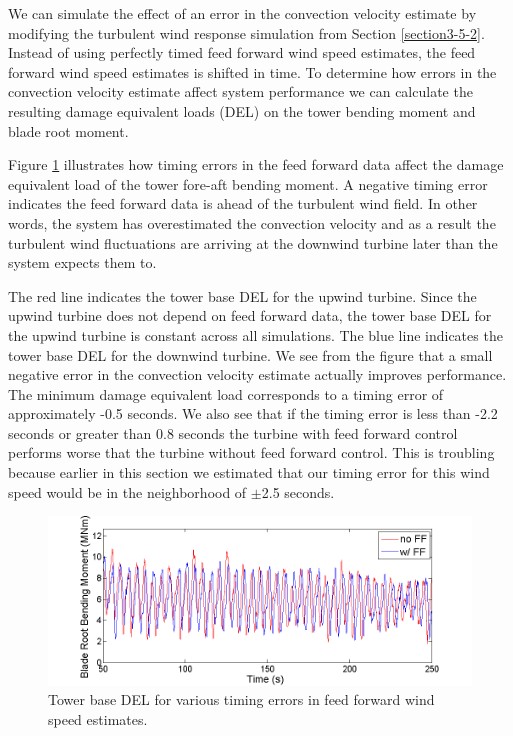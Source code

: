 We can simulate the effect of an error in the convection velocity estimate by modifying the turbulent wind response simulation from Section \ref{section3-5-2}. Instead of using perfectly timed feed forward wind speed estimates, the feed forward wind speed estimates is shifted in time. To determine how errors in the convection velocity estimate affect system performance we can calculate the resulting damage equivalent loads (DEL) on the tower bending moment and blade root moment.

Figure \ref{fig3-36} illustrates how timing errors in the feed forward data affect the damage equivalent load of the tower fore-aft bending moment. A negative timing error indicates the feed forward data is ahead of the turbulent wind field. In other words, the system has overestimated the convection velocity and as a result the turbulent wind fluctuations are arriving at the downwind turbine later than the system expects them to. 

The red line indicates the tower base DEL for the upwind turbine. Since the upwind turbine does not depend on feed forward data, the tower base DEL for the upwind turbine is constant across all simulations. The blue line indicates the tower base DEL for the downwind turbine. We see from the figure that a small negative error in the convection velocity estimate actually improves performance. The minimum damage equivalent load corresponds to a timing error of approximately -0.5 seconds. We also see that if the timing error is less than -2.2 seconds or greater than 0.8 seconds the turbine with feed forward control performs worse that the turbine without feed forward control. This is troubling because earlier in this section we estimated that our timing error for this wind speed would be in the neighborhood of $\pm$2.5 seconds.

\begin{figure}[htbp]
	\centering
		\includegraphics[width = \linewidth]{Figures/ch3Figures/fig3-35.png}
		
	\caption{Tower base DEL for various timing errors in feed forward wind speed estimates.}
	\label{fig3-36}
\end{figure}

